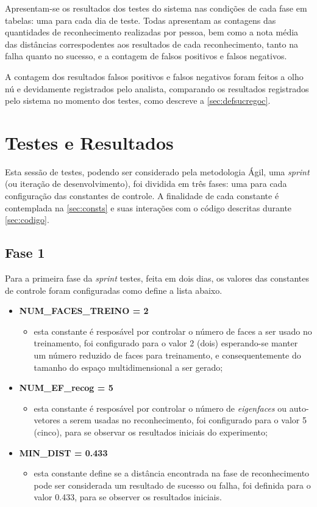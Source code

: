 Apresentam-se os resultados dos testes do sistema nas condições de cada fase em tabelas: uma para cada dia de teste. Todas apresentam as contagens das quantidades de reconhecimento realizadas por pessoa, bem como a nota média das distâncias correspodentes aos resultados de cada reconhecimento, tanto na falha quanto no sucesso, e a contagem de falsos positivos e falsos negativos.

A contagem dos resultados falsos positivos e falsos negativos foram feitos a olho nú e devidamente registrados pelo analista, comparando os resultados registrados pelo sistema no momento dos testes, como descreve a \autoref{sec:defsucregoc}.

\section{Testes e Resultados}\label{ch:testresult}

Esta sessão de testes, podendo ser considerado pela metodologia Ágil, uma \textit{sprint} (ou iteração de desenvolvimento), foi dividida em três fases: uma para cada configuração das constantes de controle. A finalidade de cada constante é contemplada na \autoref{sec:consts} e suas interações com o código descritas durante \autoref{sec:codigo}.


\subsection{Fase 1}\label{ch:testresultfaz1}
Para a primeira fase da \textit{sprint} testes, feita em dois dias, os valores das constantes de controle foram configuradas como define a lista abaixo.

\begin{itemize}	
	\item \textbf{NUM\_FACES\_TREINO = 2}
	\begin{itemize}	
		\item esta constante é resposável por controlar o número de faces a ser usado no treinamento, foi configurado para o valor 2 (dois) esperando-se manter um número reduzido de faces para treinamento, e consequentemente do tamanho do espaço multidimensional a ser gerado;
	\end{itemize}

	\item \textbf{NUM\_EF\_recog = 5}
	\begin{itemize}	
		\item esta constante é resposável por controlar o número de \textit{eigenfaces} ou auto-vetores a serem usadas no reconhecimento, foi configurado para o valor 5 (cinco), para se observar os resultados iniciais do experimento;
	\end{itemize}

	\item \textbf{MIN\_DIST = 0.433}
	\begin{itemize}	
		\item esta constante define se a distância encontrada na fase de reconhecimento pode ser considerada um resultado de sucesso ou falha, foi definida para o valor 0.433, para se observer os resultados iniciais.
	\end{itemize}
\end{itemize}

